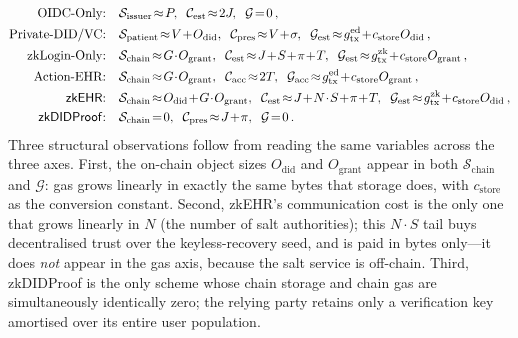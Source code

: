 \begin{align*}
  \text{OIDC-Only:}\quad        & \mathcal{S}_{\text{issuer}} \!\approx\! P,\;\;
                                  \mathcal{C}_{\text{est}} \!\approx\! 2J,\;\;
                                  \mathcal{G} \!=\! 0\,, \\
  \text{Private-DID/VC:}\quad   & \mathcal{S}_{\text{patient}} \!\approx\! V\!+\!O_{\text{did}},\;\;
                                  \mathcal{C}_{\text{pres}} \!\approx\! V\!+\!\sigma,\;\;
                                  \mathcal{G}_{\text{est}} \!\approx\! g_{\text{tx}}^{\text{ed}}\!+\!c_{\text{store}}O_{\text{did}}\,, \\
  \text{zkLogin-Only:}\quad     & \mathcal{S}_{\text{chain}} \!\approx\! G\!\cdot\!O_{\text{grant}},\;\;
                                  \mathcal{C}_{\text{est}} \!\approx\! J\!+\!S\!+\!\pi\!+\!T,\;\;
                                  \mathcal{G}_{\text{est}} \!\approx\! g_{\text{tx}}^{\text{zk}}\!+\!c_{\text{store}}O_{\text{grant}}\,, \\
  \text{Action-EHR:}\quad       & \mathcal{S}_{\text{chain}} \!\approx\! G\!\cdot\!O_{\text{grant}},\;\;
                                  \mathcal{C}_{\text{acc}} \!\approx\! 2T,\;\;
                                  \mathcal{G}_{\text{acc}} \!\approx\! g_{\text{tx}}^{\text{ed}}\!+\!c_{\text{store}}O_{\text{grant}}\,, \\
  \text{\textsf{zkEHR}:}\quad   & \mathcal{S}_{\text{chain}} \!\approx\! O_{\text{did}}\!+\!G\!\cdot\!O_{\text{grant}},\;\;
                                  \mathcal{C}_{\text{est}} \!\approx\! J\!+\!N\!\cdot\!S\!+\!\pi\!+\!T,\;\;
                                  \mathcal{G}_{\text{est}} \!\approx\! g_{\text{tx}}^{\text{zk}}\!+\!c_{\text{store}}O_{\text{did}}\,, \\
  \text{\textsf{zkDIDProof}:}\quad & \mathcal{S}_{\text{chain}} \!=\! 0,\;\;
                                  \mathcal{C}_{\text{pres}} \!\approx\! J\!+\!\pi,\;\;
                                  \mathcal{G} \!=\! 0\,.
\end{align*}
Three structural observations follow from reading the same variables
across the three axes. First, the on-chain object sizes
$O_{\text{did}}$ and $O_{\text{grant}}$ appear in both
$\mathcal{S}_{\text{chain}}$ and $\mathcal{G}$: gas grows linearly in
exactly the same bytes that storage does, with $c_{\text{store}}$ as
the conversion constant. Second, \textsf{zkEHR}'s communication cost is
the only one that grows linearly in $N$ (the number of salt
authorities); this $N\!\cdot\!S$ tail buys decentralised trust over the
keyless-recovery seed, and is paid in bytes only---it does \emph{not}
appear in the gas axis, because the salt service is off-chain. Third,
\textsf{zkDIDProof} is the only scheme whose chain storage and chain
gas are simultaneously identically zero; the relying party retains only
a verification key amortised over its entire user population.

